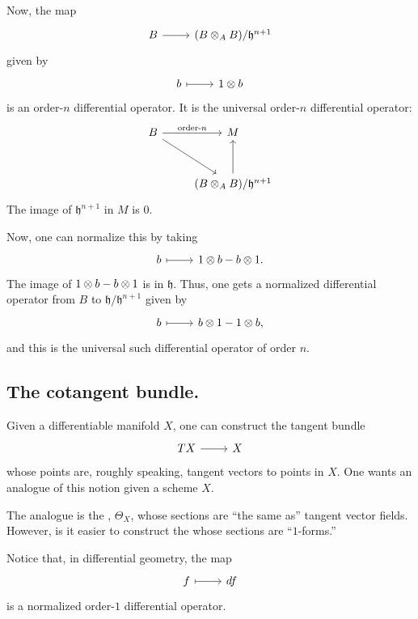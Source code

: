 \documentclass [11 pt, oneside] {article}
\begin{document}
Now, the map
\[
\begin{tikzcd}
	B\ar[r] & (B\tensor_A B)/ \mathfrak{h}^{n+1} 
\end{tikzcd}
\]
given by
\[
\begin{tikzcd}
	b\ar[r,mapsto] & 1\tensor b
\end{tikzcd}
\]
is an order-$n$ differential operator. It is the universal order-$n$ differential operator:
\[
\begin{tikzcd}[row sep = 3 em]
	B\ar[r,"\textrm{order-$n$}"] \ar[dr] & M\\
					     &(B\tensor_A B)/ \mathfrak{h}^{n+1} \ar[u]
\end{tikzcd}
\]
The image of $\mathfrak{h}^{n+1}$ in $M$ is $0$. 

Now, one can normalize this by taking
\[
\begin{tikzcd}
	b\ar[r, mapsto] &1\tensor b - b\tensor 1.
\end{tikzcd}
\]
The image of $1\otimes b-b\otimes 1$ is in $\mathfrak{h}$. 
Thus, one gets a normalized differential operator from $B$ to $\mathfrak{h}/\mathfrak{h}^{n+1}$ given by
\[
\begin{tikzcd}
	b\ar[r,mapsto] & b\tensor 1-1\tensor b,
\end{tikzcd}
\]
and this is the universal such differential operator of order $n$.

\subsection{The cotangent bundle.}
Given a differentiable manifold $X$, one can construct the tangent bundle 
\[
\begin{tikzcd}
	TX\ar[r] & X
\end{tikzcd}
\]
whose points are, roughly speaking, tangent vectors to points in $X$.
One wants an analogue of this notion given a scheme $X$.

The analogue is the , $\Theta_X$, whose sections are ``the same as'' tangent vector fields.
However, is it easier to construct the  whose sections are ``$1$-forms.''

Notice that, in differential geometry, the map
\[
\begin{tikzcd}
	f\ar[r,mapsto]&df
\end{tikzcd}
\]
is a normalized order-$1$ differential operator.
\end{document}
